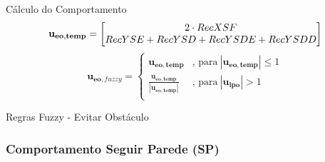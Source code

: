 \begin{frame}
	
\end{frame}

\begin{frame}
	
\end{frame}

\begin{frame}
	\begin{block}{Cálculo do Comportamento}
		\begin{equation}
				\mathbf{u_{eo,temp}} = 
				\mleft[
				\begin{matrix}
			  		2 \cdot RecXSF \\
			  		RecYSE + RecYSD + RecYSDE + RecYSDD \\
				\end{matrix}
				\mright]
		\end{equation}
		\pause
		\begin{equation}
				\mathbf{u_{eo,\mathit{fuzzy}}} = 
				\begin{cases}
					\mathbf{u_{eo,temp}} & \text{, para} \ | \mathbf{u_{eo,temp}} | \leq 1 \\
					\frac{\mathbf{u_{eo,temp}}}{| \mathbf{u_{eo,temp}} |} & \text{, para} \ | \mathbf{u_{ipo}} | > 1 \\
				\end{cases}
		\end{equation}
	\end{block}
\end{frame}

\begin{frame}
	\begin{exampleblock}{Regras Fuzzy - Evitar Obstáculo}
		
	\end{exampleblock}
\end{frame}

\begin{frame}
	\frametitle{Comportamento Seguir Parede (SP)}
	
\end{frame}

\begin{frame}
	
\end{frame}

\begin{frame}
	
\end{frame}


